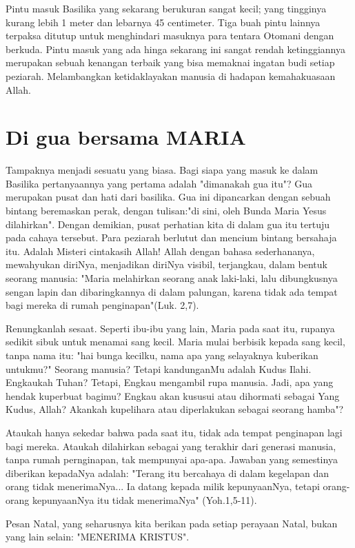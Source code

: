 Pintu masuk Basilika yang sekarang berukuran sangat kecil; yang tingginya kurang lebih 1 meter dan lebarnya 45 centimeter. Tiga buah pintu lainnya terpaksa ditutup untuk menghindari masuknya para tentara Otomani dengan berkuda. Pintu masuk yang ada hinga sekarang ini sangat rendah ketinggiannya merupakan sebuah kenangan terbaik yang bisa memaknai ingatan budi setiap peziarah. Melambangkan ketidaklayakan manusia di hadapan kemahakuasaan Allah.

\section*{Di gua bersama MARIA}

Tampaknya menjadi sesuatu yang biasa. Bagi siapa yang masuk ke dalam Basilika pertanyaannya yang pertama adalah "dimanakah gua itu"? Gua merupakan pusat dan hati dari basilika. Gua ini dipancarkan dengan sebuah bintang beremaskan perak, dengan tulisan:"di sini, oleh Bunda Maria Yesus dilahirkan". Dengan demikian, pusat perhatian kita di dalam gua itu tertuju pada cahaya tersebut. Para peziarah berlutut dan mencium bintang bersahaja itu. Adalah Misteri cintakasih Allah! Allah dengan bahasa sederhananya, mewahyukan diriNya, menjadikan diriNya visibil, terjangkau, dalam bentuk seorang manusia: "Maria melahirkan seorang anak laki-laki, lalu dibungkusnya sengan lapin dan dibaringkannya di dalam palungan, karena tidak ada tempat bagi mereka di rumah penginapan"(Luk. 2,7). 

Renungkanlah sesaat. Seperti ibu-ibu yang lain, Maria pada saat itu, rupanya sedikit sibuk untuk menamai sang kecil. Maria mulai berbisik kepada sang kecil, tanpa nama itu: "hai bunga kecilku, nama apa yang selayaknya kuberikan untukmu?" Seorang manusia? Tetapi kandunganMu adalah Kudus Ilahi. Engkaukah Tuhan? Tetapi, Engkau mengambil rupa manusia. Jadi, apa yang hendak kuperbuat bagimu? Engkau akan kususui atau dihormati sebagai Yang Kudus, Allah? Akankah kupelihara atau diperlakukan sebagai seorang hamba"?

Ataukah hanya sekedar bahwa pada saat itu, tidak ada tempat penginapan lagi bagi mereka. Ataukah dilahirkan sebagai yang terakhir dari generasi manusia, tanpa rumah pernginapan, tak mempunyai apa-apa. Jawaban yang semestinya diberikan kepadaNya adalah: "Terang itu bercahaya di dalam kegelapan dan orang tidak menerimaNya... Ia datang kepada milik kepunyaanNya, tetapi orang-orang kepunyaanNya itu tidak menerimaNya" (Yoh.1,5-11). 

Pesan Natal, yang seharusnya kita berikan pada setiap perayaan Natal, bukan yang lain selain: "MENERIMA KRISTUS".

